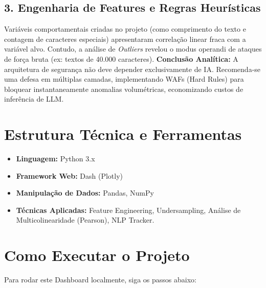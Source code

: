 \documentclass[12pt,a4paper]{article}
\begin{document}
\subsection{3. Engenharia de Features e Regras Heurísticas}
Variáveis comportamentais criadas no projeto (como comprimento do texto e contagem de caracteres especiais) apresentaram correlação linear fraca com a variável alvo. Contudo, a análise de \textit{Outliers} revelou o modus operandi de ataques de força bruta (ex: textos de 40.000 caracteres).
\textbf{Conclusão Analítica:} A arquitetura de segurança não deve depender exclusivamente de IA. Recomenda-se uma defesa em múltiplas camadas, implementando WAFs (Hard Rules) para bloquear instantaneamente anomalias volumétricas, economizando custos de inferência de LLM.

\section{Estrutura Técnica e Ferramentas}
\begin{itemize}[label=\textcolor{ItauOrange}{\textbullet}]
    \item \textbf{Linguagem:} Python 3.x
    \item \textbf{Framework Web:} Dash (Plotly)
    \item \textbf{Manipulação de Dados:} Pandas, NumPy
    \item \textbf{Técnicas Aplicadas:} Feature Engineering, Undersampling, Análise de Multicolinearidade (Pearson), NLP Tracker.
\end{itemize}

\section{Como Executar o Projeto}
Para rodar este Dashboard localmente, siga os passos abaixo:
\end{document}
